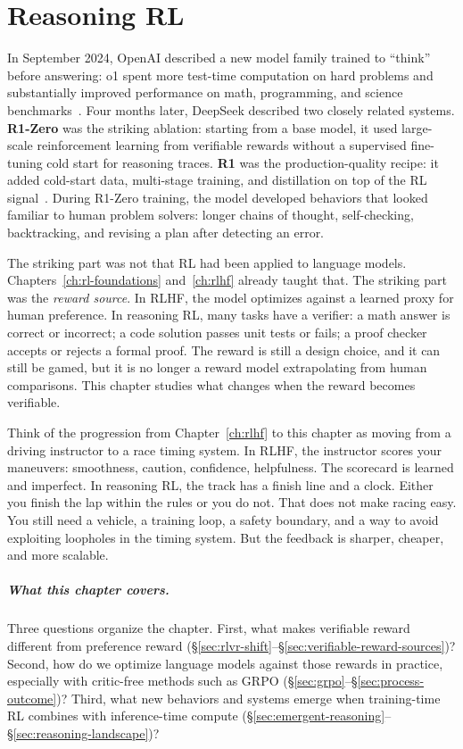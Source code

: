 \chapter{Reasoning RL}
\label{ch:reasoning-rl}
\raggedbottom

In September 2024, OpenAI described a new model family trained to ``think'' before answering: o1 spent more test-time computation on hard problems and substantially improved performance on math, programming, and science benchmarks~\cite{openai2024reasoning}. Four months later, DeepSeek described two closely related systems. \textbf{R1-Zero} was the striking ablation: starting from a base model, it used large-scale reinforcement learning from verifiable rewards without a supervised fine-tuning cold start for reasoning traces. \textbf{R1} was the production-quality recipe: it added cold-start data, multi-stage training, and distillation on top of the RL signal~\cite{deepseekai2025r1}. During R1-Zero training, the model developed behaviors that looked familiar to human problem solvers: longer chains of thought, self-checking, backtracking, and revising a plan after detecting an error.

The striking part was not that RL had been applied to language models. Chapters~\ref{ch:rl-foundations} and~\ref{ch:rlhf} already taught that. The striking part was the \emph{reward source}. In RLHF, the model optimizes against a learned proxy for human preference. In reasoning RL, many tasks have a verifier: a math answer is correct or incorrect; a code solution passes unit tests or fails; a proof checker accepts or rejects a formal proof. The reward is still a design choice, and it can still be gamed, but it is no longer a reward model extrapolating from human comparisons. This chapter studies what changes when the reward becomes verifiable.

Think of the progression from Chapter~\ref{ch:rlhf} to this chapter as moving from a driving instructor to a race timing system. In RLHF, the instructor scores your maneuvers: smoothness, caution, confidence, helpfulness. The scorecard is learned and imperfect. In reasoning RL, the track has a finish line and a clock. Either you finish the lap within the rules or you do not. That does not make racing easy. You still need a vehicle, a training loop, a safety boundary, and a way to avoid exploiting loopholes in the timing system. But the feedback is sharper, cheaper, and more scalable.

\paragraph{What this chapter covers.} Three questions organize the chapter. First, what makes verifiable reward different from preference reward (\S\ref{sec:rlvr-shift}--\S\ref{sec:verifiable-reward-sources})? Second, how do we optimize language models against those rewards in practice, especially with critic-free methods such as GRPO (\S\ref{sec:grpo}--\S\ref{sec:process-outcome})? Third, what new behaviors and systems emerge when training-time RL combines with inference-time compute (\S\ref{sec:emergent-reasoning}--\S\ref{sec:reasoning-landscape})?

